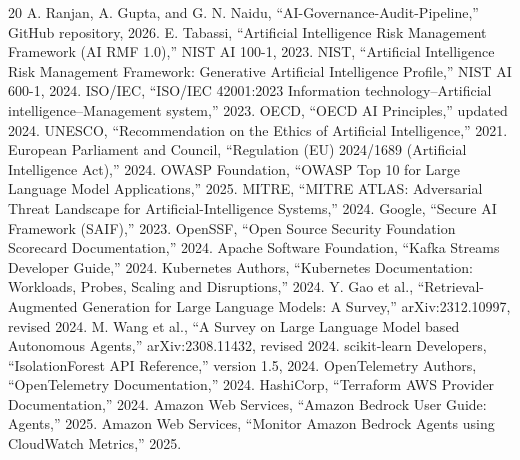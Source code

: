 \documentclass[conference]{IEEEtran}
\begin{document}
\begin{thebibliography}{20}
 A. Ranjan, A. Gupta, and G. N. Naidu, ``AI-Governance-Audit-Pipeline,'' GitHub repository, 2026.
 E. Tabassi, ``Artificial Intelligence Risk Management Framework (AI RMF 1.0),'' NIST AI 100-1, 2023.
 NIST, ``Artificial Intelligence Risk Management Framework: Generative Artificial Intelligence Profile,'' NIST AI 600-1, 2024.
 ISO/IEC, ``ISO/IEC 42001:2023 Information technology--Artificial intelligence--Management system,'' 2023.
 OECD, ``OECD AI Principles,'' updated 2024.
 UNESCO, ``Recommendation on the Ethics of Artificial Intelligence,'' 2021.
 European Parliament and Council, ``Regulation (EU) 2024/1689 (Artificial Intelligence Act),'' 2024.
 OWASP Foundation, ``OWASP Top 10 for Large Language Model Applications,'' 2025.
 MITRE, ``MITRE ATLAS: Adversarial Threat Landscape for Artificial-Intelligence Systems,'' 2024.
 Google, ``Secure AI Framework (SAIF),'' 2023.
 OpenSSF, ``Open Source Security Foundation Scorecard Documentation,'' 2024.
 Apache Software Foundation, ``Kafka Streams Developer Guide,'' 2024.
 Kubernetes Authors, ``Kubernetes Documentation: Workloads, Probes, Scaling and Disruptions,'' 2024.
 Y. Gao et al., ``Retrieval-Augmented Generation for Large Language Models: A Survey,'' arXiv:2312.10997, revised 2024.
 M. Wang et al., ``A Survey on Large Language Model based Autonomous Agents,'' arXiv:2308.11432, revised 2024.
 scikit-learn Developers, ``IsolationForest API Reference,'' version 1.5, 2024.
 OpenTelemetry Authors, ``OpenTelemetry Documentation,'' 2024.
 HashiCorp, ``Terraform AWS Provider Documentation,'' 2024.
 Amazon Web Services, ``Amazon Bedrock User Guide: Agents,'' 2025.
 Amazon Web Services, ``Monitor Amazon Bedrock Agents using CloudWatch Metrics,'' 2025.
\end{thebibliography}
\end{document}
